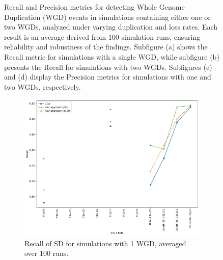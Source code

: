 \documentclass[10pt]{article}
\begin{document}
\begin{figure}[h!]
    \caption{
Recall and Precision metrics for detecting Whole Genome Duplication (WGD) events in simulations containing either one or two WGDs, analyzed under varying duplication and loss rates. Each result is an average derived from 100 simulation runs, ensuring reliability and robustness of the findings. Subfigure (a) shows the Recall metric for simulations with a single WGD, while subfigure (b) presents the Recall for simulations with two WGDs. Subfigures (c) and (d) display the Precision metrics for simulations with one and two WGDs, respectively.
    }
    \label{fig:recall-precision-wgd_old}
\end{figure}





\begin{figure}[h!]
    \centering
    \begin{subfigure}[b]{0.48\textwidth}
        \centering
        \includegraphics[width=\textwidth]{figs/recall-sd-t20-t80-Avg.pdf}
        \caption{Recall of SD for simulations with 1 WGD, averaged over 100 runs.}
        \label{fig:recall-sd-1wgd}
    \end{subfigure}
    \hfill
    \begin{subfigure}[b]{0.48\textwidth}
        \centering

\end{subfigure}
\end{figure}
\end{document}
